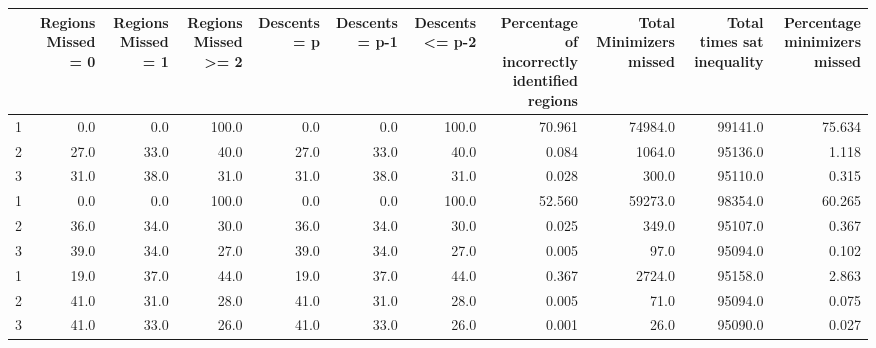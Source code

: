 \begin{tabular}{lrrrrrrrrrr}
\toprule
{} &  Regions Missed = 0 &  Regions Missed = 1 &  Regions Missed >= 2 &  Descents = p &  Descents = p-1 &  Descents <= p-2 &  Percentage of incorrectly identified regions &  Total Minimizers missed &  Total times sat inequality &  Percentage minimizers missed \\
\midrule
1 &                 0.0 &                 0.0 &                100.0 &           0.0 &             0.0 &            100.0 &                                        70.961 &                  74984.0 &                     99141.0 &                        75.634 \\
2 &                27.0 &                33.0 &                 40.0 &          27.0 &            33.0 &             40.0 &                                         0.084 &                   1064.0 &                     95136.0 &                         1.118 \\
3 &                31.0 &                38.0 &                 31.0 &          31.0 &            38.0 &             31.0 &                                         0.028 &                    300.0 &                     95110.0 &                         0.315 \\
1 &                 0.0 &                 0.0 &                100.0 &           0.0 &             0.0 &            100.0 &                                        52.560 &                  59273.0 &                     98354.0 &                        60.265 \\
2 &                36.0 &                34.0 &                 30.0 &          36.0 &            34.0 &             30.0 &                                         0.025 &                    349.0 &                     95107.0 &                         0.367 \\
3 &                39.0 &                34.0 &                 27.0 &          39.0 &            34.0 &             27.0 &                                         0.005 &                     97.0 &                     95094.0 &                         0.102 \\
1 &                19.0 &                37.0 &                 44.0 &          19.0 &            37.0 &             44.0 &                                         0.367 &                   2724.0 &                     95158.0 &                         2.863 \\
2 &                41.0 &                31.0 &                 28.0 &          41.0 &            31.0 &             28.0 &                                         0.005 &                     71.0 &                     95094.0 &                         0.075 \\
3 &                41.0 &                33.0 &                 26.0 &          41.0 &            33.0 &             26.0 &                                         0.001 &                     26.0 &                     95090.0 &                         0.027 \\
\bottomrule
\end{tabular}
